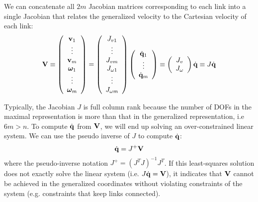 We can concatenate all $2m$ Jacobian matrices corresponding to each link into a single Jacobian
that relates the generalized velocity to the Cartesian velocity of each
link:
\begin{equation}
\mathbf{V} \equiv 
\left(
\begin{array}{c}
\mathbf{v}_1 \\
\vdots \\
\mathbf{v}_m \\
\bm{\omega}_1 \\
\vdots \\
\bm{\omega}_m
\end{array}
\right) = 
\left (
\begin{array}{c}
J_{v1} \\
\vdots \\
J_{vm} \\
J_{\omega 1} \\
\vdots \\
J_{\omega m}
\end{array}
\right) 
\left(
\begin{array}{c}
\dot{\mathbf{q}}_1\\
\vdots \\
\dot{\mathbf{q}}_m
\end{array}
\right)  \equiv \left(
\begin{array}{c}
J_v\\
J_{\omega}
\end{array}
\right)\dot{\mathbf{q}} \equiv J \dot{\mathbf{q}}
\end{equation}

Typically, the Jacobian $J$ is full column rank because the
number of DOFs in the maximal representation is more than that in the
generalized representation, i.e $6m > n$. To compute $\dot{\mathbf{q}}$ from $\mathbf{V}$, we
will end up solving an over-constrained linear system. We can use the
pseudo inverse of $J$ to compute $\dot{\mathbf{q}}$:
\begin{equation}
 \dot{\mathbf{q}} =  J^+\mathbf{V}
 \end{equation}
where the pseudo-inverse notation $J^+ = (J^TJ)^{-1}J^T$. If this
least-squares solution does not exactly solve the linear
system (i.e. $J \dot{\mathbf{q}} = \mathbf{V}$), it indicates that $\mathbf{V}$ cannot be achieved in the
generalized coordinates without violating constraints of the system
(e.g. constraints that keep links connected).

